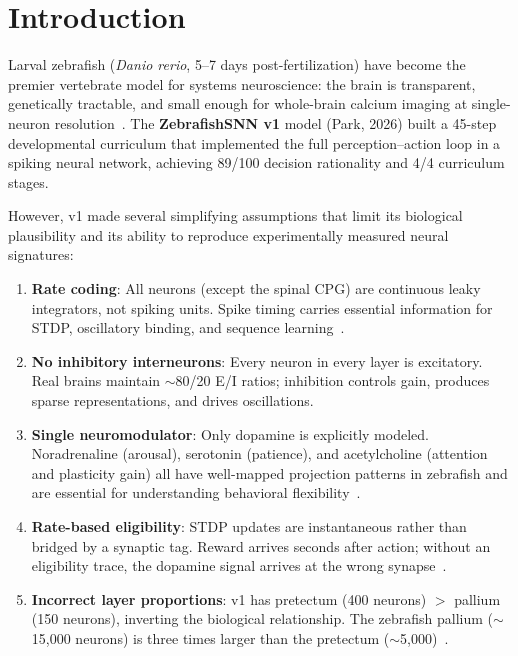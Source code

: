 \documentclass[11pt,a4paper]{article}
\begin{document}
\tableofcontents
\newpage

\section{Introduction}\label{sec:intro}

Larval zebrafish (\textit{Danio rerio}, 5--7 days post-fertilization) have
become the premier vertebrate model for systems neuroscience: the brain is
transparent, genetically tractable, and small enough for whole-brain calcium
imaging at single-neuron resolution~\cite{ahrens2013,portugues2014}.
The \textbf{ZebrafishSNN v1} model (Park, 2026) built a 45-step developmental
curriculum that implemented the full perception--action loop in a spiking
neural network, achieving 89/100 decision rationality and 4/4 curriculum stages.

However, v1 made several simplifying assumptions that limit its biological
plausibility and its ability to reproduce experimentally measured neural
signatures:

\begin{enumerate}[nosep]
  \item \textbf{Rate coding}: All neurons (except the spinal CPG) are
    continuous leaky integrators, not spiking units.
    Spike timing carries essential information for STDP, oscillatory
    binding, and sequence learning~\cite{mainen1995}.
  \item \textbf{No inhibitory interneurons}: Every neuron in every layer is
    excitatory. Real brains maintain $\sim$80/20 E/I ratios; inhibition
    controls gain, produces sparse representations, and drives oscillations.
  \item \textbf{Single neuromodulator}: Only dopamine is explicitly modeled.
    Noradrenaline (arousal), serotonin (patience), and acetylcholine (attention
    and plasticity gain) all have well-mapped projection patterns in zebrafish
    and are essential for understanding behavioral flexibility~\cite{jesuthasan2012}.
  \item \textbf{Rate-based eligibility}: STDP updates are instantaneous rather
    than bridged by a synaptic tag.
    Reward arrives seconds after action; without an eligibility trace, the
    dopamine signal arrives at the wrong synapse~\cite{fremaux2016}.
  \item \textbf{Incorrect layer proportions}: v1 has pretectum (400 neurons) $>$
    pallium (150 neurons), inverting the biological relationship.
    The zebrafish pallium ($\sim$15,000 neurons) is three times larger than
    the pretectum ($\sim$5,000)~\cite{broglio2015}.
\end{enumerate}
\end{document}
